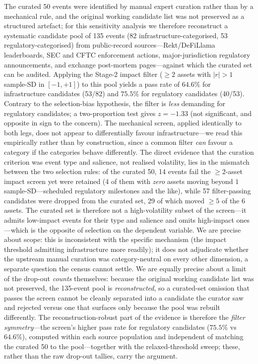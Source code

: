 \documentclass[pdflatex,sn-mathphys-num]{sn-jnl}
\theoremstyle{thmstyleone}
\theoremstyle{thmstyletwo}
\theoremstyle{thmstylethree}
\begin{document}
The curated 50 events were identified by manual expert curation rather than by a mechanical rule, and the original working candidate list was not preserved as a structured artefact; for this sensitivity analysis we therefore reconstruct a systematic candidate pool of 135 events (82 infrastructure-categorised, 53 regulatory-categorised) from public-record sources---Rekt/DeFiLlama leaderboards, SEC and CFTC enforcement actions, major-jurisdiction regulatory announcements, and exchange post-mortem pages---against which the curated set can be audited. Applying the Stage-2 impact filter ($\geq 2$ assets with $|r|>1$ sample-SD in $[-1,+1]$) to this pool yields a pass rate of $64.6\%$ for infrastructure candidates (53/82) and $75.5\%$ for regulatory candidates (40/53). Contrary to the selection-bias hypothesis, the filter is \emph{less} demanding for regulatory candidates; a two-proportion test gives $z=-1.33$ (not significant, and opposite in sign to the concern). The mechanical screen, applied identically to both legs, does not appear to differentially favour infrastructure---we read this empirically rather than by construction, since a common filter \emph{can} favour a category if the categories behave differently. The direct evidence that the curation criterion was event type and salience, not realised volatility, lies in the mismatch between the two selection rules: of the curated 50, 14 events fail the $\geq 2$-asset impact screen yet were retained (4 of them with \emph{zero} assets moving beyond $1$ sample-SD---scheduled regulatory milestones and the like), while 57 filter-passing candidates were dropped from the curated set, 29 of which moved $\geq 5$ of the 6 assets. The curated set is therefore not a high-volatility subset of the screen---it admits low-impact events for their type and salience and omits high-impact ones---which is the opposite of selection on the dependent variable. We are precise about scope: this is inconsistent with the specific mechanism (the impact threshold admitting infrastructure more readily); it does not adjudicate whether the upstream manual curation was category-neutral on every other dimension, a separate question the census cannot settle. We are equally precise about a limit of the drop-out \emph{counts} themselves: because the original working candidate list was not preserved, the 135-event pool is \emph{reconstructed}, so a curated-set omission that passes the screen cannot be cleanly separated into a candidate the curator saw and rejected versus one that surfaces only because the pool was rebuilt differently. The reconstruction-robust part of the evidence is therefore the \emph{filter symmetry}---the screen's higher pass rate for regulatory candidates ($75.5\%$ vs $64.6\%$), computed within each source population and independent of matching the curated 50 to the pool---together with the relaxed-threshold sweep; these, rather than the raw drop-out tallies, carry the argument.
\end{document}
